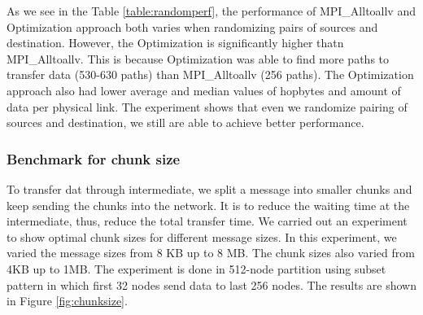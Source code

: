 
As we see in the Table \ref{table:randomperf}, the performance of MPI\_Alltoallv and Optimization approach both varies when randomizing pairs of sources and destination. However, the Optimization is significantly higher thatn MPI\_Alltoallv. This is because Optimization was able to find more paths to transfer data (530-630 paths) than MPI\_Alltoallv (256 paths). The Optimization approach also had lower average and median values of hopbytes and amount of data per physical link. The experiment shows that even we randomize pairing of sources and destination, we still are able to achieve better performance.

\subsubsection{Benchmark for chunk size}

To transfer dat through intermediate, we split a message into smaller chunks and keep sending the chunks into the network. It is to reduce the waiting time at the intermediate, thus, reduce the total transfer time. We carried out an experiment to show optimal chunk sizes for different message sizes. In this experiment, we varied the message sizes from 8 KB up to 8 MB. The chunk sizes also varied from 4KB up to 1MB. The experiment is done in 512-node partition using subset pattern in which first 32 nodes send data to last 256 nodes. The results are shown in Figure \ref{fig:chunksize}.

